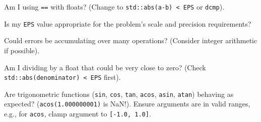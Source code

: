 \begin{debugchecklist}
\label{debug:A.3.1.fp_checklist}
    \item Am I using \texttt{==} with floats? (Change to \texttt{std::abs(a-b) < EPS} or \texttt{dcmp}).
    \item Is my \texttt{EPS} value appropriate for the problem's scale and precision requirements?
    \item Could errors be accumulating over many operations? (Consider integer arithmetic if possible).
    \item Am I dividing by a float that could be very close to zero? (Check \texttt{std::abs(denominator) < EPS} first).
    \item Are trigonometric functions (\texttt{sin}, \texttt{cos}, \texttt{tan}, \texttt{acos}, \texttt{asin}, \texttt{atan}) behaving as expected? (\texttt{acos(1.000000001)} is NaN!). Ensure arguments are in valid ranges, e.g., for \texttt{acos}, clamp argument to \texttt{[-1.0, 1.0]}.
\end{debugchecklist}
